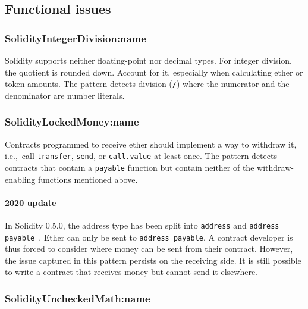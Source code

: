 \subsection{Functional issues} \label{sec:FunctionalIssues}

\subsubsection{\let\letcs\texapiletcs \usevalue SolidityIntegerDivision:name \let\letcs\etoolboxletcs} \label{SolidityIntegerDivision}

Solidity supports neither floating-point nor decimal types.
For integer division, the quotient is rounded down.
Account for it, especially when calculating ether or token amounts.
The pattern detects division (\texttt{/}) where the numerator and the denominator are number literals.

\subsubsection{\let\letcs\texapiletcs \usevalue SolidityLockedMoney:name \let\letcs\etoolboxletcs} \label{SolidityLockedMoney}

Contracts programmed to receive ether should implement a way to withdraw it, i.e.,~call \texttt{transfer}, \texttt{send}, or \texttt{call.value} at least once.
The pattern detects contracts that contain a \texttt{payable} function but contain neither of the withdraw-enabling functions mentioned above.

\paragraph{2020 update}
In Solidity 0.5.0, the address type has been split into \texttt{address} and \texttt{address payable}~\cite{Solidity050}.
Ether can only be sent to \texttt{address payable}.
A contract developer is thus forced to consider where money can be sent from their contract.
However, the issue captured in this pattern persists on the receiving side.
It is still possible to write a contract that receives money but cannot send it elsewhere.

\subsubsection{\let\letcs\texapiletcs \usevalue SolidityUncheckedMath:name \let\letcs\etoolboxletcs} \label{SolidityUncheckedMath}

